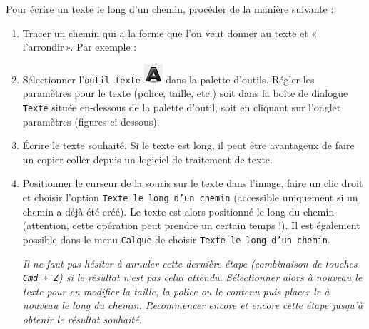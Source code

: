 \vspace{6pt}

Pour écrire un texte le long d'un chemin, procéder de la manière suivante : 

\begin{enumerate}
\item Tracer un chemin qui a la forme que l'on veut donner au texte et «\,l'arrondir\,». Par exemple :


\item Sélectionner l'\texttt{outil texte} \includegraphics[width=.6cm]{./images/image03/iconeTexte} dans la palette d'outils. Régler les paramètres pour le texte (police, taille, etc.) soit dans la boîte de dialogue \texttt{Texte} située en-dessous de la palette d'outil, soit en cliquant sur l'onglet paramètres (figures ci-dessous).


\item Écrire le texte souhaité. Si le texte est long, il peut être avantageux de faire un copier-coller depuis un logiciel de traitement de texte. 

\item Positionner le curseur de la souris sur le texte dans l'image, faire un clic droit et choisir l'option \texttt{Texte le long d'un chemin} (accessible uniquement si un chemin a déjà été créé). Le texte est alors positionné le long du chemin (attention, cette opération peut prendre un certain temps !). Il est également possible dans le menu \texttt{Calque} de choisir \texttt{Texte le long d'un chemin}. 

\emph{Il ne faut pas hésiter à annuler cette dernière étape (combinaison de touches \texttt{Cmd + Z}) si le résultat n'est pas celui attendu. Sélectionner alors à nouveau le texte pour en modifier la taille, la police ou le contenu puis placer le à nouveau le long du chemin. Recommencer encore et encore cette étape jusqu'à obtenir le résultat souhaité.}

\vspace{6pt}


\end{enumerate}
